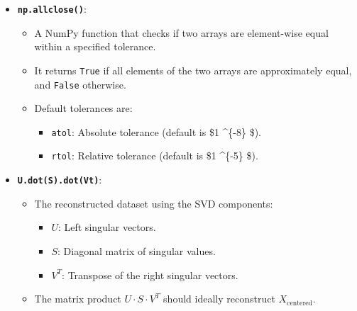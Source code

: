 \documentclass{article}
\providecommand{\tightlist}{%
      \setlength{\itemsep}{0pt}\setlength{\parskip}{0pt}}
\begin{document}
\begin{itemize}
\tightlist
\item
  \textbf{\texttt{np.allclose()}}:

  \begin{itemize}
  \tightlist
  \item
    A NumPy function that checks if two arrays are element-wise equal
    within a specified tolerance.
  \item
    It returns \texttt{True} if all elements of the two arrays are
    approximately equal, and \texttt{False} otherwise.
  \item
    Default tolerances are:

    \begin{itemize}
    \tightlist
    \item
      \texttt{atol}: Absolute tolerance (default is \$1
      \^{}\{-8\} \$).
    \item
      \texttt{rtol}: Relative tolerance (default is \$1
      \^{}\{-5\} \$).
    \end{itemize}
  \end{itemize}
\item
  \textbf{\texttt{U.dot(S).dot(Vt)}}:

  \begin{itemize}
  \tightlist
  \item
    The reconstructed dataset using the SVD components:

    \begin{itemize}
    \tightlist
    \item
      \(U\): Left singular vectors.
    \item
      \(S\): Diagonal matrix of singular values.
    \item
      \(V^T\): Transpose of the right singular vectors.
    \end{itemize}
  \item
    The matrix product \(U \cdot S \cdot V^T\) should ideally
    reconstruct \(X_{\text{centered}}\).
  \end{itemize}
\end{itemize}
\end{document}
